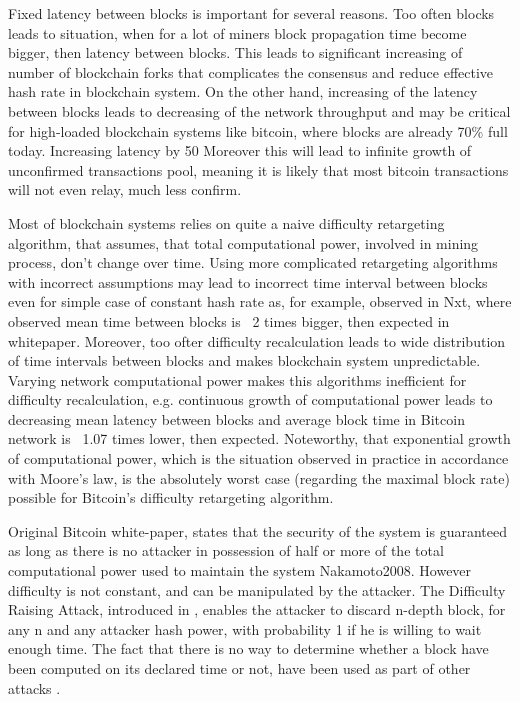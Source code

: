 \documentclass[number,preprint,review]{elsarticle}
\begin{document}
Fixed latency between blocks is important for several reasons.
Too often blocks leads to situation, when for a lot of miners block propagation time become bigger, then latency between blocks.
This leads to significant increasing of number of blockchain forks that complicates the consensus\cite{decker2013information} and reduce effective hash rate in blockchain system.
On the other hand, increasing of the latency between blocks leads to decreasing of the network throughput\cite{miller2016} and may be critical for high-loaded blockchain systems like bitcoin, where blocks are already 70\% full today\cite{armstrong2016}.
Increasing latency by 50%
Moreover this will lead to infinite growth of unconfirmed transactions pool, meaning it is likely that most bitcoin transactions will not even relay, much less confirm.

Most of blockchain systems relies on quite a naive difficulty retargeting algorithm, that assumes, that total computational power, involved in mining process, don't change over time.
Using more complicated retargeting algorithms with incorrect assumptions\cite{andruiman2014} may lead to incorrect time interval between blocks even for simple case of constant hash rate as, for example, observed in Nxt, where observed mean time between blocks is ~2 times bigger, then expected in whitepaper\cite{nxt}. Moreover, too ofter difficulty recalculation leads to wide distribution of time intervals between blocks and makes blockchain system unpredictable\cite{andruiman2014}.
Varying network computational power makes this algorithms inefficient for difficulty recalculation, e.g. continuous growth of computational power leads to decreasing mean latency between blocks and average block time in Bitcoin network is ~1.07 times lower, then expected.
Noteworthy, that exponential growth of computational power, which is the situation observed in practice in accordance with Moore’s law\cite{moore2006cramming}, is the absolutely worst case (regarding the maximal block rate) possible for Bitcoin’s difficulty retargeting algorithm\cite{kraft2015difficulty}.

Original Bitcoin white-paper, states that the security of the system is guaranteed as long as there is no attacker in possession of half or more of the total computational power used to maintain the system {Nakamoto2008}.
However difficulty is not constant, and can be manipulated by the attacker.
The Difficulty Raising Attack, introduced in \cite{bahack2013theoretical}, enables the attacker to discard n-depth block, for any n and any attacker hash power, with probability 1 if he is willing to wait enough time.
The fact that there is no way to determine whether a block have been computed on its declared time or not, have been used as part of other attacks \cite{timejacking2011, artforz2011}.
\end{document}
